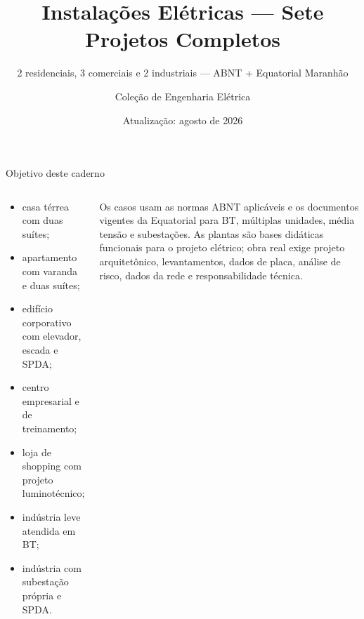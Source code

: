 \documentclass[11pt,aspectratio=169]{beamer}
\title{Instalações Elétricas — Sete Projetos Completos}
\subtitle{2 residenciais, 3 comerciais e 2 industriais — ABNT + Equatorial Maranhão}
\author{Coleção de Engenharia Elétrica}
\institute{Material 03 — caderno de projetos}
\date{Atualização: agosto de 2026}
\begin{document}
{\begin{frame}\titlepage\end{frame}}
\begin{frame}{Objetivo deste caderno}
\small
\begin{columns}[T,onlytextwidth]
\begin{caixaProjeto}[title=Sete arquiteturas diferentes]
\begin{itemize}
\item casa térrea com duas suítes;
\item apartamento com varanda e duas suítes;
\item edifício corporativo com elevador, escada e SPDA;
\item centro empresarial e de treinamento;
\item loja de shopping com projeto luminotécnico;
\item indústria leve atendida em BT;
\item indústria com subestação própria e SPDA.
\end{itemize}
\end{caixaProjeto}
\begin{caixaNorma}[title=Base técnica]
Os casos usam as normas ABNT aplicáveis e os documentos vigentes da Equatorial para BT, múltiplas unidades, média tensão e subestações. As plantas são bases didáticas funcionais para o projeto elétrico; obra real exige projeto arquitetônico, levantamentos, dados de placa, análise de risco, dados da rede e responsabilidade técnica.
\end{caixaNorma}
\end{columns}
\end{frame}

\begin{frame}[plain]
\end{frame}
\end{document}
